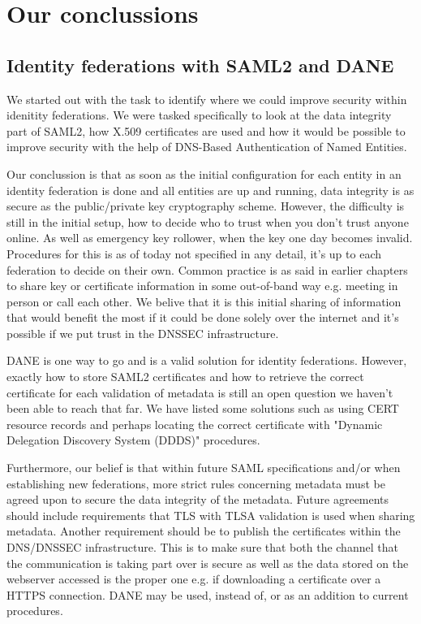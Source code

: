 \section{Our conclussions}
\subsection{Identity federations with SAML2 and DANE}
We started out with the task to identify where we could improve security within idenitity federations.
We were tasked specifically to look at the data integrity part of SAML2, how X.509 certificates are used and how it would be possible to improve security with the help of DNS-Based Authentication of Named Entities.

Our conclussion is that as soon as the initial configuration for each entity in an identity federation is done and all 
entities are up and running, data integrity is as secure as the public/private key cryptography scheme.
However, the difficulty is still in the initial setup, how to decide who to trust when you don't trust anyone online. 
As well as emergency key rollower, when the key one day becomes invalid. 
Procedures for this is as of today not specified in any detail, it's up to each federation to decide on their own.
Common practice is as said in earlier chapters to share key or certificate information in some out-of-band way e.g. meeting in person or call each other.
We belive that it is this initial sharing of information that would benefit the most if it could be done solely over the internet and it's possible if we put trust in the DNSSEC infrastructure.

DANE is one way to go and is a valid solution for identity federations.
However, exactly how to store SAML2 certificates and how to retrieve the correct certificate for each validation of metadata is still an open question we haven't been able to reach that far.
We have listed some solutions such as using CERT resource records and perhaps locating the correct certificate with "Dynamic Delegation Discovery System (DDDS)" procedures.

Furthermore, our belief is that within future SAML specifications and/or when establishing new federations, more strict rules concerning metadata must be agreed upon to secure the data integrity of the metadata.
Future agreements should include requirements that TLS with TLSA validation is used when sharing metadata.
Another requirement should be to publish the certificates within the DNS/DNSSEC infrastructure.
This is to make sure that both the channel that the communication is taking part over is secure as well as the data stored on the webserver accessed is the proper one e.g. if downloading a certificate over a HTTPS connection.
DANE may be used, instead of, or as an addition to current procedures.

